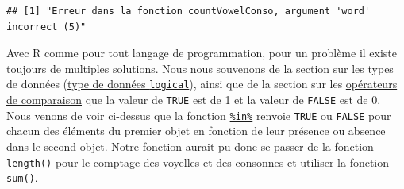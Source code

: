 \documentclass[twoside,symmetric]{book}
\newenvironment{Shaded}{}{}
\newcommand{\CommentTok}[1]{\textit{#1}}
\newcommand{\ControlFlowTok}[1]{\textbf{#1}}
\newcommand{\DataTypeTok}[1]{\underline{#1}}
\newcommand{\DecValTok}[1]{#1}
\newcommand{\KeywordTok}[1]{\textbf{#1}}
\newcommand{\NormalTok}[1]{#1}
\newcommand{\OperatorTok}[1]{#1}
\newcommand{\StringTok}[1]{#1}
\begin{document}
\begin{verbatim}
## [1] "Erreur dans la fonction countVowelConso, argument 'word'
incorrect (5)"
\end{verbatim}

Avec R comme pour tout langage de programmation, pour un problème il existe toujours de multiples solutions. Nous nous souvenons de la section sur les types de données (\protect\hyperlink{l013logi}{type de données \texttt{logical}}), ainsi que de la section sur les \protect\hyperlink{l011opcomp}{opérateurs de comparaison} que la valeur de \texttt{TRUE} est de 1 et la valeur de \texttt{FALSE} est de 0. Nous venons de voir ci-dessus que la fonction \protect\hyperlink{l015in}{\texttt{\%in\%}} renvoie \texttt{TRUE} ou \texttt{FALSE} pour chacun des éléments du premier objet en fonction de leur présence ou absence dans le second objet. Notre fonction aurait pu donc se passer de la fonction \texttt{length()} pour le comptage des voyelles et des consonnes et utiliser la fonction \texttt{sum()}.

\begin{Shaded}
\end{Shaded}
\end{document}
